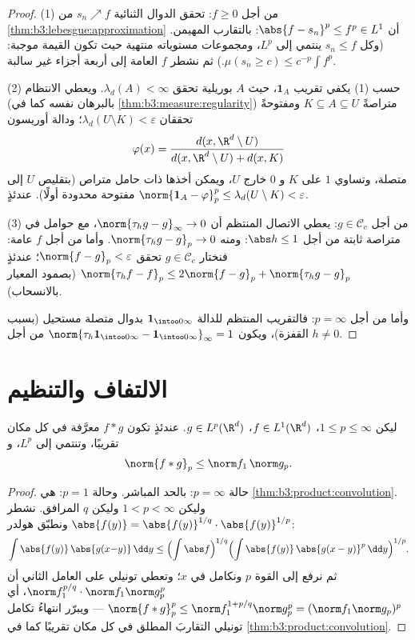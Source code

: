 \begin{proof}
(1) من أجل $f \geq 0$: تحقق الدوال الثنائية $s_n \nearrow f$ من
\cref{thm:b3:lebesgue:approximation} أن $\abs{f - s_n}^p
\leq f^p \in L^1$: بالتقارب المهيمن. (وكل $s_n \leq f$ ينتمي
إلى $L^p$، ومجموعات مستوياته منتهية  حيث تكون القيمة
موجبة: $\mu(s_n \geq c) \leq c^{-p}\int f^p$.) ثم نشطر $f$ العامة إلى أربعة أجزاء غير سالبة.

(2) حسب (1) يكفي تقريب $\mathbf 1_A$، حيث $A$ بوريلية تحقق
$\lambda_d(A) < \infty$. ويعطي الانتظام (بالبرهان نفسه كما في \cref{thm:b3:measure:regularity}) متراصةً
$K \subseteq A
\subseteq U$ ومفتوحةً تحققان $\lambda_d(U\setminus K) <
\varepsilon$؛ ودالة أوريسون
\[
\varphi(x) = \frac{d(x, \R^d\setminus U)}{d(x, \R^d\setminus U)
+ d(x, K)}
\]
متصلة، وتساوي $1$ على $K$ و $0$ خارج $U$، ويمكن أخذها ذات حامل
متراص (بتقليص $U$ إلى مفتوحة محدودة أولًا). عندئذٍ
$\norm{\mathbf 1_A - \varphi}_p^p \leq \lambda_d(U\setminus K)
< \varepsilon$.

(3) من أجل $g \in \mathcal C_c$: يعطي الاتصال المنتظم أن $\norm{\tau_hg - g}_\infty \to 0$، مع حوامل في
متراصة ثابتة من أجل $\abs h \leq 1$: ومنه $\norm{\tau_hg - g}_p \to 0$. وأما من أجل
$f$ عامة: فنختار $g \in \mathcal C_c$ تحقق $\norm{f - g}_p <
\varepsilon$؛ عندئذٍ $\norm{\tau_hf - f}_p \leq 2\norm{f - g}_p +
\norm{\tau_hg - g}_p$ (بصمود
المعيار بالانسحاب).

وأما من أجل $p = \infty$: فالتقريب المنتظم للدالة $\mathbf
1_{\intoo0\infty}$ بدوال
متصلة مستحيل (بسبب القفزة)، ويكون $\norm{\tau_h\mathbf 1_{\intoo0\infty} - \mathbf
1_{\intoo0\infty}}_\infty = 1$ من أجل $h \neq 0$.
\end{proof}

\section{الالتفاف والتنظيم}

\begin{theorem}\label{thm:b3:lp:young}
ليكن $1 \leq p \leq \infty$، $f \in L^1(\R^d)$، $g \in
L^p(\R^d)$. عندئذٍ تكون $f * g$ معرَّفة في كل
مكان تقريبًا، وتنتمي إلى $L^p$،
و
\[
\norm{f * g}_p \leq \norm f_1\,\norm g_p .
\]
\end{theorem}

\begin{proof}
حالة $p = \infty$: بالحد المباشر. وحالة $p = 1$: هي
\cref{thm:b3:product:convolution}. وليكن $1 < p < \infty$ وليكن $q$ المرافق. نشطر
$\abs{f(y)} = \abs{f(y)}^{1/q}\cdot
\abs{f(y)}^{1/p}$ ونطبّق هولدر:
\[
\int\abs{f(y)}\,\abs{g(x{-}y)}\,\dd y
\leq \Bigl(\int\abs f\Bigr)^{1/q}
\Bigl(\int\abs{f(y)}\,\abs{g(x - y)}^p\,\dd y\Bigr)^{1/p} .
\]
ثم نرفع إلى القوة $p$ ونكامل في $x$؛ وتعطي تونيلي على العامل
الثاني أن $\norm f_1^{p/q}\cdot\norm f_1\norm g_p^p$، أي $\norm{f*g}_p^p \leq \norm f_1^{1 + p/q}\norm g_p^p =
(\norm f_1\norm g_p)^p$ --- ويبرّر انتهاءُ تكامل تونيلي
التقاربَ المطلق في كل مكان تقريبًا كما في \cref{thm:b3:product:convolution}.
\end{proof}


